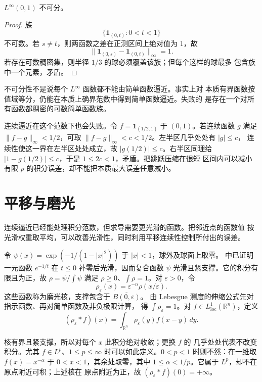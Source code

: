 \begin{proposition}
\label{prop:linfty-nonseparable}
\(L^\infty(0,1)\) 不可分。
\end{proposition}

\begin{proof}
族
\[
 \{\mathbf1_{(0,t)}:0<t<1\}
\]
不可数。若 \(s\ne t\)，则两函数之差在正测区间上绝对值为 \(1\)，故
\[
 \|\mathbf1_{(0,s)}-\mathbf1_{(0,t)}\|_\infty=1.
\]
若存在可数稠密集，则半径 \(1/3\) 的球必须覆盖该族；但每个这样的球最多
包含族中一个元素，矛盾。
\end{proof}

不可分性不是说每个 \(L^\infty\) 函数都不能由简单函数逼近。事实上对
本质有界函数按值域等分，仍能在本质上确界范数中得到简单函数逼近。失败的
是存在一个对所有函数都稠密的可数简单函数族。

连续逼近在这个范数下也会失败。令 \(f=\mathbf1_{(1/2,1)}\) 于
\((0,1)\)。若连续函数 \(g\) 满足 \(\|f-g\|_\infty<1/2\)，可取
\(\|f-g\|_\infty<c<1/2\)。左半区几乎处处有 \(|g|\le c\)，
连续性使这一界在左半区处处成立，故 \(|g(1/2)|\le c\)。右半区同理给
\(|1-g(1/2)|\le c\)，于是 \(1\le2c<1\)，矛盾。把跳跃压缩在很短
区间内可以减小有限 \(p\) 的积分误差，却不能把本质最大误差任意减小。

\section{平移与磨光}

连续逼近已经能处理积分范数，但求导需要更光滑的函数。把邻近点的函数值
按光滑权重取平均，可以改善光滑性，同时利用平移连续性控制所付出的误差。

令 \(\psi(x)=\exp(-1/(1-|x|^2))\) 于 \(|x|<1\)，球外及球面上取零。
中已证明一元函数 \(e^{-1/t}\) 在 \(t\le0\)
补零后光滑，因而复合函数
\(\psi\) 光滑且紧支撑。它的积分有限且为正，故
\(\rho=\psi/\int\psi\) 满足
\(\rho\ge0\)、\(\int\rho=1\)。对 \(\varepsilon>0\)，令
\[
 \rho_\varepsilon(x)=\varepsilon^{-n}\rho(x/\varepsilon).
\]
这些函数称为磨光核，支撑包含于 \(\overline{B(0,\varepsilon)}\)。
由 Lebesgue 测度的伸缩公式先对指示函数、再对简单函数及非负极限计算，
得 \(\int\rho_\varepsilon=1\)。对 \(f\in L^1_{\mathrm{loc}}(\mathbb R^n)\)，定义
\[
 (\rho_\varepsilon*f)(x)
 =\int_{\mathbb R^n}\rho_\varepsilon(y)f(x-y)\,dy.
\]

核有界且紧支撑，所以对每个 \(x\) 此积分绝对收敛；更换 \(f\) 的
几乎处处代表不改变积分。尤其 \(f\in L^p\)、\(1\le p\le\infty\)
时可以如此定义。\(0<p<1\) 时则不然：在一维取
\(f(x)=x^{-\alpha}\) 于 \(0<x<1\)，其余处取零，其中
\(1\le\alpha<1/p\)。它属于 \(L^p\)，却不在原点附近可积；上述核在
原点附近为正，故 \((\rho_\varepsilon*f)(0)=+\infty\)。

